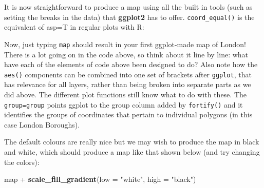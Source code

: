 \documentclass[]{article}
\newenvironment{Shaded}{}{}
\newcommand{\KeywordTok}[1]{\textcolor[rgb]{0.00,0.44,0.13}{\textbf{{#1}}}}
\newcommand{\DataTypeTok}[1]{\textcolor[rgb]{0.56,0.13,0.00}{{#1}}}
\newcommand{\CharTok}[1]{\textcolor[rgb]{0.25,0.44,0.63}{{#1}}}
\newcommand{\StringTok}[1]{\textcolor[rgb]{0.25,0.44,0.63}{{#1}}}
\newcommand{\NormalTok}[1]{{#1}}
\begin{document}
It is now straightforward to produce a map using all the built in tools
(such as setting the breaks in the data) that \textbf{ggplot2} has to
offer. \texttt{coord\_equal()} is the equivalent of asp=T in regular
plots with R:

\begin{Shaded}
\end{Shaded}

Now, just typing \texttt{map} should result in your first ggplot-made
map of London! There is a lot going on in the code above, so think about
it line by line: what have each of the elements of code above been
designed to do? Also note how the \texttt{aes()} components can be
combined into one set of brackets after \texttt{ggplot}, that has
relevance for all layers, rather than being broken into separate parts
as we did above. The different plot functions still know what to do with
these. The \texttt{group=group} points ggplot to the group column added
by \texttt{fortify()} and it identifies the groups of coordinates that
pertain to individual polygons (in this case London Boroughs).

The default colours are really nice but we may wish to produce the map
in black and white, which should produce a map like that shown below
(and try changing the colors):

\begin{Shaded}
\begin{Highlighting}[]
\NormalTok{map +}\StringTok{ }\KeywordTok{scale_fill_gradient}\NormalTok{(}\DataTypeTok{low =} \StringTok{"white"}\NormalTok{, }\DataTypeTok{high =} \StringTok{"black"}\NormalTok{)}
\end{Highlighting}
\end{Shaded}
\end{document}
